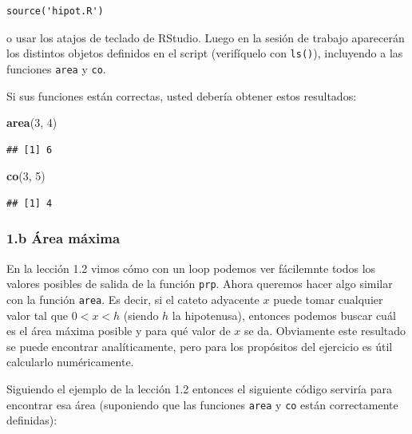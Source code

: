 \documentclass[]{article}
\newenvironment{Shaded}{}{}
\newcommand{\KeywordTok}[1]{\textcolor[rgb]{0.00,0.44,0.13}{\textbf{{#1}}}}
\newcommand{\DecValTok}[1]{\textcolor[rgb]{0.25,0.63,0.44}{{#1}}}
\newcommand{\NormalTok}[1]{{#1}}
\begin{document}
\begin{verbatim}
source('hipot.R')
\end{verbatim}
o usar los atajos de teclado de RStudio. Luego en la sesión de trabajo
aparecerán los distintos objetos definidos en el script (verifíquelo con
\texttt{ls()}), incluyendo a las funciones \texttt{area} y \texttt{co}.

Si sus funciones están correctas, usted debería obtener estos
resultados:

\begin{Shaded}
\begin{Highlighting}[]
\KeywordTok{area}\NormalTok{(}\DecValTok{3}\NormalTok{, }\DecValTok{4}\NormalTok{)}
\end{Highlighting}
\end{Shaded}
\begin{verbatim}
## [1] 6
\end{verbatim}
\begin{Shaded}
\begin{Highlighting}[]
\KeywordTok{co}\NormalTok{(}\DecValTok{3}\NormalTok{, }\DecValTok{5}\NormalTok{)}
\end{Highlighting}
\end{Shaded}
\begin{verbatim}
## [1] 4
\end{verbatim}
\subsubsection{1.b Área máxima}

En la lección 1.2 vimos cómo con un loop podemos ver fácilemnte todos
los valores posibles de salida de la función \texttt{prp}. Ahora
queremos hacer algo similar con la función \texttt{area}. Es decir, si
el cateto adyacente $x$ puede tomar cualquier valor tal que $0 < x < h$
(siendo $h$ la hipotenusa), entonces podemos buscar cuál es el área
máxima posible y para qué valor de $x$ se da. Obviamente este resultado
se puede encontrar analíticamente, pero para los propósitos del
ejercicio es útil calcularlo numéricamente.

Siguiendo el ejemplo de la lección 1.2 entonces el siguiente código
serviría para encontrar esa área (suponiendo que las funciones
\texttt{area} y \texttt{co} están correctamente definidas):
\end{document}
